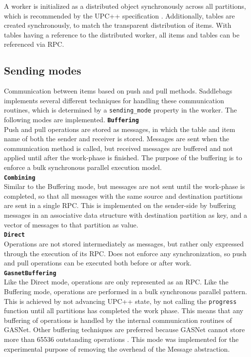 \documentclass{uit-report}
\begin{document}
A worker is initialized as a distributed object synchronously across all partitions, which is recommended by the UPC++ specification \cite{upc_language_specification}. Additionally, tables are created synchronously, to match the transparent distribution of items. With tables having a reference to the distributed worker, all items and tables can be referenced via RPC.

\subsection{Sending modes} \label{section:sendingmodes}
Communication between items based on push and pull methods. Saddlebags implements several different techniques for handling these communication routines, which is determined by a \texttt{sending\_mode} property in the worker. The following modes are implemented.
\newpage
\hspace{4ex} \textbf{\texttt{Buffering}}
\\
Push and pull operations are stored as messages, in which the table and item name of both the sender and receiver is stored. Messages are sent when the communication method is called, but received messages are buffered and not applied until after the work-phase is finished. The purpose of the buffering is to enforce a bulk synchronous parallel execution model.\\

\hspace{4ex} \textbf{\texttt{Combining}}
\\
Similar to the Buffering mode, but messages are not sent until the work-phase is completed, so that all messages with the same source and destination partitions are sent in a single RPC. This is implemented on the sender-side by buffering messages in an associative data structure with destination partition as key, and a vector of messages to that partition as value.\\

\hspace{4ex} \textbf{\texttt{Direct}}
\\
Operations are not stored intermediately as messages, but rather only expressed through the execution of its RPC. Does not enforce any synchronization, so push and pull operations can be executed both before or after work. \\

\hspace{4ex} \textbf{\texttt{GasnetBuffering}}
\\
Like the Direct mode, operations are only represented as an RPC. Like the Buffering mode, operations are performed in a bulk synchronous parallel pattern. This is achieved by not advancing UPC++ state, by not calling the \texttt{progress} function until all partitions has completed the work phase. This means that any buffering of operations is handled by the internal communication routines of GASNet. Other buffering techniques are preferred because GASNet cannot store more than 65536 outstanding operations \cite{gasnetpresentation}. This mode was implemented for the experimental purpose of removing the overhead of the Message abstraction.
\end{document}
